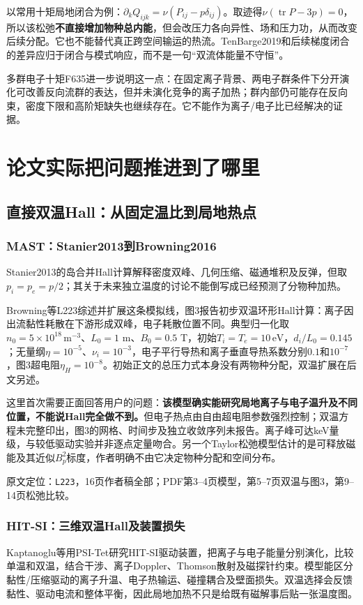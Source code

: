 \documentclass[UTF8,a4paper,11pt,openany,fontset=fandol]{ctexbook}
\newcommand{\loc}[2]{\par\noindent\textsf{原文定位：}\texttt{#1}，#2。\par}
\newcommand{\eV}{\,\mathrm{eV}}
\begin{document}
以常用十矩局地闭合为例：$\partial_kQ_{ijk}=\nu(P_{ij}-p\delta_{ij})$。取迹得$\nu(\operatorname{tr}P-3p)=0$，所以该松弛\textbf{不直接增加物种总内能}，但会改压力各向异性、场和压力功，从而改变后续分配。它也不能替代真正跨空间输运的热流。TenBarge2019和后续梯度闭合的差异应归于闭合与模式响应，而不是一句“双流体能量不守恒”。\citep{TenBarge2019MMS,Ng2020,Closure2026}

多群电子十矩F635进一步说明这一点：在固定离子背景、两电子群条件下分开演化可改善反向流群的表达，但并未演化竞争的离子加热；群内部仍可能存在反向束，密度下限和高阶矩缺失也继续存在。它不能作为离子/电子比已经解决的证据。\citep{F635}

\chapter{论文实际把问题推进到了哪里}
\section{直接双温Hall：从固定温比到局地热点}
\subsection{MAST：Stanier2013到Browning2016}
Stanier2013的岛合并Hall计算解释密度双峰、几何压缩、磁通堆积及反弹，但取$p_i=p_e=p/2$；其关于未来独立温度的讨论不能倒写成已经预测了分物种加热。\citep{Stanier2013}

Browning等L223综述并扩展这条模拟线，图3报告初步双温环形Hall计算：离子因出流黏性耗散在下游形成双峰，电子耗散位置不同。典型归一化取$n_0=5\times10^{18}\,\mathrm{m^{-3}}$、$L_0=1$ m、$B_0=0.5$ T，初始$T_i=T_e=10\eV$，$d_i/L_0=0.145$；无量纲$\eta=10^{-5}$、$\nu_i=10^{-3}$，电子平行导热和离子垂直导热系数分别$0.1$和$10^{-7}$，图3超电阻$\eta_H=10^{-8}$。初始正文的总压力式本身没有两物种分配，双温扩展在后文另述。\citep{L223}

这里首次需要正面回答用户的问题：\textbf{该模型确实能研究局地离子与电子温升及不同位置，不能说Hall完全做不到。}但电子热点由自由超电阻参数强烈控制；双温方程未完整印出，图3的网格、时间步及独立收敛序列未报告。离子峰可达keV量级，与较低驱动实验并非逐点定量吻合。另一个Taylor松弛模型估计的是可释放磁能及其近似$B_p^2$标度，作者明确不由它决定物种分配和空间分布。
\loc{L223}{16页作者稿全部；PDF第3--4页模型，第5--7页双温与图3，第9--14页松弛比较}

\subsection{HIT-SI：三维双温Hall及装置损失}
Kaptanoglu等用PSI-Tet研究HIT-SI驱动装置，把离子与电子能量分别演化，比较单温和双温，结合干涉、离子Doppler、Thomson散射及磁探针约束。模型能区分黏性/压缩驱动的离子升温、电子热输运、碰撞耦合及壁面损失。双温选择会反馈黏性、驱动电流和整体平衡，因此局地加热不只是给既有磁解事后贴一张温度图。\citep{Kaptanoglu2020}
\end{document}
